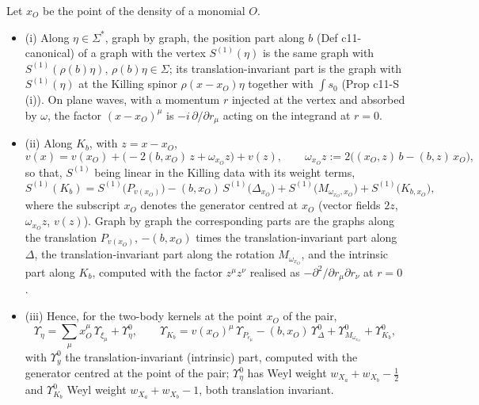 \begin{proposition}
\label{prop:qs-posdec}
Let $x_O$ be the point of the density of a monomial $O$.
\begin{itemize}
\item (i) Along $\eta\in\Sigma^*$, graph by graph, the position part along $b$ (Def c11-canonical) of a graph with the vertex $S^{(1)}(\eta)$ is the same graph with $S^{(1)}(\rho(b)\eta)$, $\rho(b)\eta\in\Sigma$; its translation-invariant part is the graph with $S^{(1)}(\eta)$ at the Killing spinor $\rho(x-x_O)\eta$ together with $\int s_0$ (Prop c11-S (i)). On plane waves, with a momentum $r$ injected at the vertex and absorbed by $\omega$, the factor $(x-x_O)^\mu$ is $-i\,\partial/\partial r_\mu$ acting on the integrand at $r=0$.
\item (ii) Along $K_b$, with $z=x-x_O$,
\[
v(x)=v(x_O)+\big(-2(b,x_O)\,z+\omega_{x_O}z\big)+v(z),\qquad \omega_{x_O}z:=2\big((x_O,z)\,b-(b,z)\,x_O\big),
\]
so that, $S^{(1)}$ being linear in the Killing data with its weight terms,
\begin{equation}
S^{(1)}(K_b)=S^{(1)}\big(P_{v(x_O)}\big)-(b,x_O)\,S^{(1)}\big(\Delta_{x_O}\big)+S^{(1)}\big(M_{\omega_{x_O},x_O}\big)+S^{(1)}\big(K_{b,x_O}\big),
\label{eq:qs-Kdec}
\end{equation}
where the subscript $x_O$ denotes the generator centred at $x_O$ (vector fields $2z$, $\omega_{x_O}z$, $v(z)$). Graph by graph the corresponding parts are the graphs along the translation $P_{v(x_O)}$, $-(b,x_O)$ times the translation-invariant part along $\Delta$, the translation-invariant part along the rotation $M_{\omega_{x_O}}$, and the intrinsic part along $K_b$, computed with the factor $z^\mu z^\nu$ realised as $-\partial^2/\partial r_\mu\partial r_\nu$ at $r=0$.
\item (iii) Hence, for the two-body kernels at the point $x_O$ of the pair,
\[
\Upsilon_\eta=\sum_\mu x_O^\mu\,\Upsilon_{\xi_\mu}+\Upsilon^0_\eta,\qquad \Upsilon_{K_b}=v(x_O)^\mu\,\Upsilon_{P_{e_\mu}}-(b,x_O)\,\Upsilon^0_\Delta+\Upsilon^0_{M_{\omega_{x_O}}}+\Upsilon^0_{K_b},
\]
with $\Upsilon^0_y$ the translation-invariant (intrinsic) part, computed with the generator centred at the point of the pair; $\Upsilon^0_\eta$ has Weyl weight $w_{X_a}+w_{X_b}-\tfrac12$ and $\Upsilon^0_{K_b}$ Weyl weight $w_{X_a}+w_{X_b}-1$, both translation invariant.
\end{itemize}
\end{proposition}

